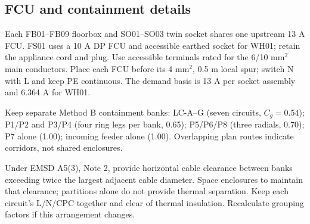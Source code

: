 \subsection*{FCU and containment details}
Each FB01--FB09 floorbox and SO01--SO03 twin socket shares one upstream 13 A FCU. FS01 uses a 10 A DP FCU and accessible earthed socket for WH01; retain the appliance cord and plug. Use accessible terminals rated for the 6/10 mm$^2$ main conductors. Place each FCU before its 4 mm$^2$, 0.5 m local spur; switch N with L and keep PE continuous. The demand basis is 13 A per socket assembly and 6.364 A for WH01.

Keep separate Method B containment banks: LC-A--G (seven circuits, $C_g=0.54$); P1/P2 and P3/P4 (four ring legs per bank, 0.65); P5/P6/P8 (three radials, 0.70); P7 alone (1.00); incoming feeder alone (1.00). Overlapping plan routes indicate corridors, not shared enclosures.

Under EMSD A5(3), Note 2, provide horizontal cable clearance between banks exceeding twice the largest adjacent cable diameter. Space enclosures to maintain that clearance; partitions alone do not provide thermal separation. Keep each circuit's L/N/CPC together and clear of thermal insulation. Recalculate grouping factors if this arrangement changes.
